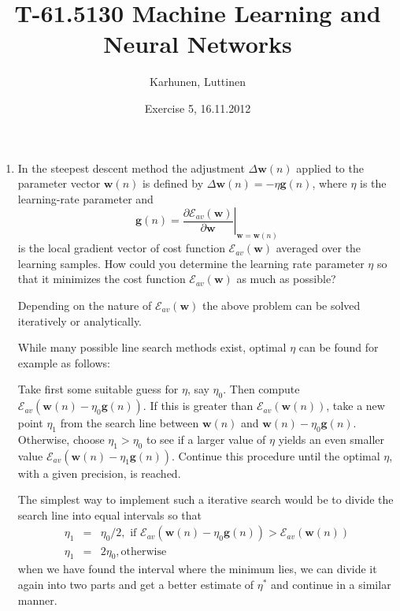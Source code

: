 
\title{T-61.5130 Machine Learning and Neural Networks}
\author{Karhunen, Luttinen}
\date{Exercise 5, 16.11.2012}

\newcommand{\vect}[1]{{\bf{#1}}}
\newcommand{\svect}[1]{\boldsymbol{#1}}
\newcommand{\matr}[1]{\boldsymbol{#1}}




\maketitle

\begin{enumerate}
  
\item In the steepest descent method the adjustment
  $\Delta\mathbf{w}(n)$ applied to the parameter vector
  $\mathbf{w}(n)$ is defined by
  $\Delta\mathbf{w}(n)=-\eta\mathbf{g}(n)$, where $\eta$ is the
  learning-rate parameter and
  \begin{equation*}
    \mathbf{g}(n)=\left.\frac{\partial
        \mathcal{E}_{av}(\mathbf{w})}{\partial \mathbf{w}}\right|_{\mathbf{w}=\mathbf{w}(n)}
  \end{equation*}
  is the local gradient vector of cost
  function $\mathcal{E}_{av}(\mathbf{w})$ averaged over the learning
  samples. How could you determine the learning rate parameter $\eta$ so
  that it minimizes the cost function $\mathcal{E}_{av}(\mathbf{w})$ as much as possible?

  \begin{solution}

    Depending on the nature of $\mathcal{E}_{av}(\mathbf{w})$ the above
    problem can be solved iteratively or analytically.

    While many possible line search methods exist,
    optimal $\eta$ can be found for example as follows:

    Take first some suitable guess for $\eta$, say $\eta_0$. Then compute
    $\mathcal{E}_{av}(\mathbf{w}(n)-\eta_0\mathbf{g}(n))$. If this is
    greater than $\mathcal{E}_{av}(\mathbf{w}(n))$, take a new point
    $\eta_1$ from the search line between $\mathbf{w}(n)$ and
    $\mathbf{w}(n)-\eta_0\mathbf{g}(n)$. Otherwise, choose $\eta_1>\eta_0$
    to see if a larger value of $\eta$ yields an even smaller value
    $\mathcal{E}_{av}(\mathbf{w}(n)-\eta_1\mathbf{g}(n))$. Continue this
    procedure until the optimal $\eta$, with a given precision, is reached.

    The simplest way to implement such a iterative search would be to
    divide the search line into equal intervals so that
    \begin{eqnarray*}
      \eta_1&=&\eta_0/2, \mbox{ if
      }\mathcal{E}_{av}(\mathbf{w}(n)-\eta_0\mathbf{g}(n))>\mathcal{E}_{av}(\mathbf{w}(n))\\
      \eta_1&=&2\eta_0, \mbox{otherwise}
    \end{eqnarray*}
    when we have found the interval where the minimum lies, we can divide
    it again into two parts and get a better estimate of $\eta^*$ and continue in a similar manner.


\end{solution}
\end{enumerate}
